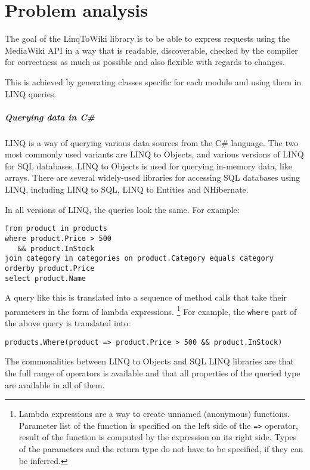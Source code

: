 \chapter{Problem analysis}
\label{goal}

The goal of the LinqToWiki library is to be able to express requests using the MediaWiki \ac{API}
in a way that is readable, discoverable, checked by the compiler for correctness as much as possible and also flexible with regards to changes.

This is achieved by generating classes specific for each module and using them in LINQ queries.

\paragraph{Querying data in C\#}

\ac{LINQ} is a way of querying various data sources from the C\# language.
The two most commonly used variants are LINQ to Objects, and various versions of LINQ for \ac{SQL} databases.
LINQ to Objects is used for querying in-memory data, like arrays.
There are several widely-used libraries for accessing \ac{SQL} databases using LINQ, including LINQ to SQL, LINQ to Entities and NHibernate.

In all versions of \ac{LINQ}, the queries look the same. For example:

\begin{lstlisting}
from product in products
where product.Price > 500
   && product.InStock
join category in categories on product.Category equals category
orderby product.Price
select product.Name
\end{lstlisting}

A query like this is translated into a sequence of method calls that take their parameters in the form of lambda expressions.%
\footnote{
Lambda expressions are a way to create unnamed (anonymous) functions.
Parameter list of the function is specified on the left side of the \lstinline{=>} operator,
result of the function is computed by the expression on its right side.
Types of the parameters and the return type do not have to be specified, if they can be inferred.
}
For example, the \lstinline{where} part of the above query is translated into:

\begin{lstlisting}
products.Where(product => product.Price > 500 && product.InStock)
\end{lstlisting}

The commonalities between LINQ to Objects and SQL LINQ libraries are that the full range of operators is available
and that all properties of the queried type are available in all of them.

